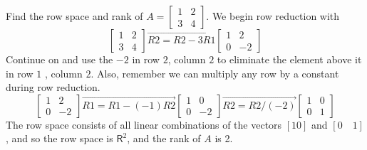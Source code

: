 \documentclass[../main.tex]{subfiles}
\begin{document}
\begin{example}
 Find the row space and rank of $A=\left[\begin{array}{ll}1 & 2 \\ 3 & 4\end{array}\right]$. We begin row reduction with
$$
\left[\begin{array}{ll}
1 & 2 \\
3 & 4
\end{array}\right] \overrightarrow{R 2=R 2-3 R 1}\left[\begin{array}{cc}
1 & 2 \\
0 & -2
\end{array}\right]
$$
Continue on and use the $-2$ in row $2$, column $2$ to eliminate the element above it in row $1$ , column $2 .$ Also, remember we can multiply any row by a constant during row reduction.
$$
\left[\begin{array}{cc}
1 & 2 \\
0 & -2
\end{array}\right] \overrightarrow{R 1=R 1-(-1) R 2}\left[\begin{array}{cc}
1 & 0 \\
0 & -2
\end{array}\right] \overrightarrow{R 2=R 2 /(-2)}\left[\begin{array}{ll}
1 & 0 \\
0 & 1
\end{array}\right]
$$
The row space consists of all linear combinations of the vectors $[10]$ and $[0 \quad 1]$, and so the row space is $\mathsf{R}^{2}$, and the rank of $A$ is 2.
\end{example}
\end{document}
